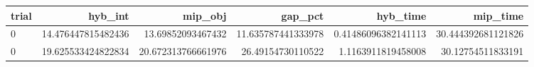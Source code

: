 \begin{tabular}{lrrrrr}
\hline
trial & hyb_int & mip_obj & gap_pct & hyb_time & mip_time \\ \hline
0 & 14.476447815482436 & 13.69852093467432 & 11.635787441333978 & 0.41486096382141113 & 30.444392681121826 \\
0 & 19.625533424822834 & 20.672313766661976 & 26.49154730110522 & 1.1163911819458008 & 30.12754511833191 \\
\hline
\end{tabular}
